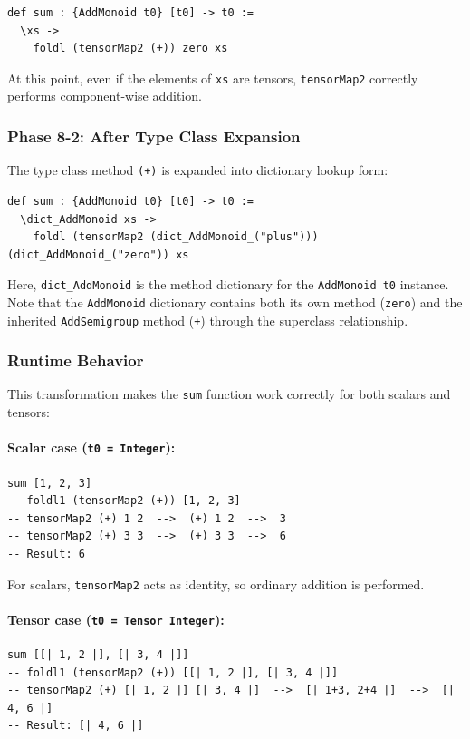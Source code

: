 \begin{lstlisting}[language=egison,numbers=none]
def sum : {AddMonoid t0} [t0] -> t0 :=
  \xs ->
    foldl (tensorMap2 (+)) zero xs
\end{lstlisting}

At this point, even if the elements of \lstinline{xs} are tensors, \lstinline{tensorMap2} correctly performs component-wise addition.

\subsubsection{Phase 8-2: After Type Class Expansion}

The type class method \lstinline{(+)} is expanded into dictionary lookup form:

\begin{lstlisting}[language=egison,numbers=none]
def sum : {AddMonoid t0} [t0] -> t0 :=
  \dict_AddMonoid xs ->
    foldl (tensorMap2 (dict_AddMonoid_("plus"))) (dict_AddMonoid_("zero")) xs
\end{lstlisting}

Here, \lstinline{dict_AddMonoid} is the method dictionary for the \lstinline{AddMonoid t0} instance.
Note that the \lstinline{AddMonoid} dictionary contains both its own method (\lstinline{zero}) and the inherited \lstinline{AddSemigroup} method (\lstinline{+}) through the superclass relationship.

\subsubsection{Runtime Behavior}

This transformation makes the \lstinline{sum} function work correctly for both scalars and tensors:

\paragraph{Scalar case (\lstinline{t0 = Integer}):}
\begin{lstlisting}[language=egison,numbers=none]
sum [1, 2, 3]
-- foldl1 (tensorMap2 (+)) [1, 2, 3]
-- tensorMap2 (+) 1 2  -->  (+) 1 2  -->  3
-- tensorMap2 (+) 3 3  -->  (+) 3 3  -->  6
-- Result: 6
\end{lstlisting}

For scalars, \lstinline{tensorMap2} acts as identity, so ordinary addition is performed.

\paragraph{Tensor case (\lstinline{t0 = Tensor Integer}):}
\begin{lstlisting}[language=egison,numbers=none]
sum [[| 1, 2 |], [| 3, 4 |]]
-- foldl1 (tensorMap2 (+)) [[| 1, 2 |], [| 3, 4 |]]
-- tensorMap2 (+) [| 1, 2 |] [| 3, 4 |]  -->  [| 1+3, 2+4 |]  -->  [| 4, 6 |]
-- Result: [| 4, 6 |]
\end{lstlisting}

